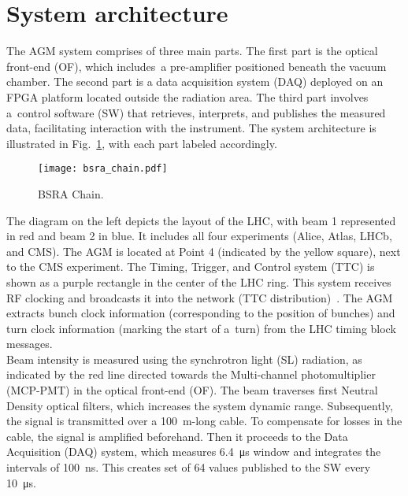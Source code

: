 \section{System architecture}
The AGM system comprises of three main parts. The first part is the optical front-end
(OF), which includes~a pre-amplifier positioned beneath the vacuum chamber. The
second part is a data acquisition system (DAQ) deployed on an FPGA platform
located outside the radiation area. The third part involves a~control software (SW) that
retrieves, interprets, and publishes the measured data, facilitating interaction
with the instrument. The system architecture is illustrated in
Fig.~\ref{fig:bsra_chain}, with each part labeled accordingly.
\begin{figure}[!tbh]
    \centering
    \texttt{[image: bsra\_chain.pdf]}
    \caption{BSRA Chain.}
    \label{fig:bsra_chain}
\end{figure} 
The diagram on the left depicts the layout of the LHC, with beam 1 represented
in red and beam 2 in blue. It includes all four experiments (Alice, Atlas,
LHCb, and CMS). The AGM is located at Point 4 (indicated by the yellow
square), next to the CMS experiment. The Timing, Trigger, and Control system
(TTC) is shown as a purple rectangle in the center of the LHC ring. This system
receives RF clocking and broadcasts it into the network (TTC
distribution)~\cite{ttc_distribution}. The AGM extracts bunch clock information
(corresponding to the position of bunches) and turn clock information (marking
the start of a~turn) from the LHC timing block messages.\\
Beam intensity is measured using the synchrotron light (SL) radiation, as indicated by the red line directed towards the Multi-channel photomultiplier
(MCP-PMT) in the optical front-end (OF). The beam traverses first Neutral Density optical filters, which increases the system dynamic range. Subsequently, the signal is
transmitted over a \SI{100}{m}-long cable. To compensate for losses in the cable,
the signal is amplified beforehand. Then it proceeds to the Data Acquisition
(DAQ) system, which measures \SI{6.4}{\micro\second} window and integrates the
intervals of \SI{100}{\nano\second}. This creates set of 64 values published to
the SW every \SI{10}{\micro\second}.

